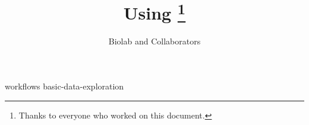 \documentclass[symmetric, justified, a4paper]{tufte-book}
\title{Using \mutation\thanks{Thanks to everyone who worked on this document.}}
\author[Biolab and Collaborators]{Biolab and Collaborators}
\begin{document}
\frontmatter

\maketitle



\tableofcontents

%

\mainmatter



{workflows}
{basic-data-exploration}



















\backmatter





\printindex
\end{document}
